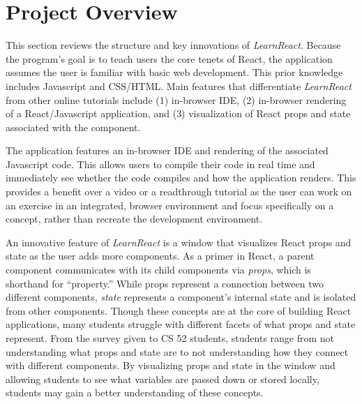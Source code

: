 \documentclass[11pt]{article}
\begin{document}

\section{Project Overview}

This section reviews the structure and key innovations of \textit{LearnReact}. Because the program's goal is to teach users the core tenets of React, the application assumes the user is familiar with basic web development. This prior knowledge includes Javascript and CSS/HTML. Main features that differentiate \textit{LearnReact} from other online tutorials include (1) in-browser IDE, (2) in-browser rendering of a React/Javascript application, and (3) visualization of React props and state associated with the component.

The application features an in-browser IDE and rendering of the associated Javascript code. This allows users to compile their code in real time and immediately see whether the code compiles and how the application renders. This provides a benefit over a video or a readthrough tutorial as the user can work on an exercise in an integrated, browser environment and focus specifically on a concept, rather than recreate the development environment.

An innovative feature of \textit{LearnReact} is a window that visualizes React props and state as the user adds more components. As a primer in React, a parent component communicates with its child components via \textit{props}, which is shorthand for ``property.'' While props represent a connection between two different components, \textit{state} represents a component's internal state and is isolated from other components. Though these concepts are at the core of building React applications, many students struggle with different facets of what props and state represent. From the survey given to CS 52 students, students range from not understanding what props and state are to not understanding how they connect with different components. By visualizing props and state in the window and allowing students to see what variables are passed down or stored locally, students may gain a better understanding of these concepts.
\end{document}
